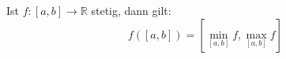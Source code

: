 Ist $f: [a, b] \to \mathbb{R}$ stetig, dann gilt:
$$f([a, b]) = \left[ \min_{[a, b]} f, \max_{[a, b]} f \right]$$